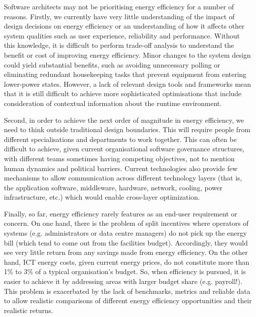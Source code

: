 Software architects may not be prioritising energy efficiency for a number of reasons. Firstly, we currently have very little understanding of the impact of design decisions on energy efficiency or an understanding of how it affects other system qualities such as user experience, reliability and performance.  Without this knowledge, it is difficult to perform trade-off analysis to understand the benefit or cost of improving energy efficiency. Minor changes to the system design could yield substantial benefits, such as avoiding unnecessary polling or eliminating redundant housekeeping tasks that prevent equipment from entering lower-power states. However, a lack of relevant design tools and frameworks mean that it is still difficult to achieve more sophisticated optimisations that include consideration of contextual information about the runtime environment. 

Second, in order to achieve the next order of magnitude in energy efficiency, we need to think outside traditional design boundaries. This will require people from different specialisations and departments to work together. This can often be difficult to achieve, given current organisational software governance structures, with different teams sometimes having competing objectives, not to mention human dynamics and political barriers. Current technologies also provide few mechanisms to allow communication across different technology layers (that is, the application software, middleware, hardware, network, cooling, power infrastructure, etc.) which would enable cross-layer optimization.

Finally, so far, energy efficiency rarely features as an end-user requirement or concern. On one hand, there is the problem of split incentives where operators of systems (e.g. administrators or data centre managers) do not pick up the energy bill (which tend to come out from the facilities budget). Accordingly, they would see very little return from any savings made from energy efficiency. On the other hand, ICT energy costs, given current energy prices, do not constitute more than 1\% to 3\% of a typical organisation’s budget. So, when efficiency is pursued, it is easier to achieve it by addressing areas with larger budget share (e.g. payroll!). This problem is exacerbated by the lack of benchmarks, metrics and reliable data to allow realistic comparisons of different energy efficiency opportunities and their realistic returns.

